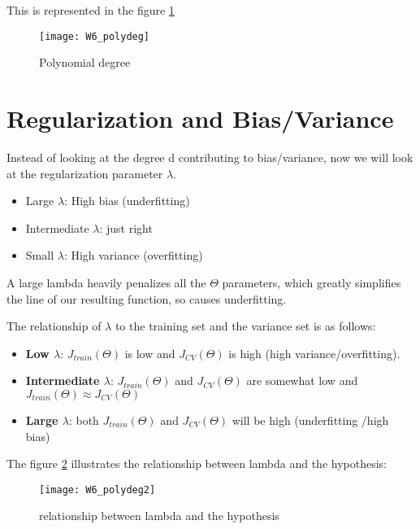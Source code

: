 This is represented in the figure \ref{fig:W6_polydeg}
\begin{figure}[ht]
\center
\texttt{[image: W6\_polydeg]}
\caption{Polynomial degree}
\label{fig:W6_polydeg}
\end{figure}
\section{Regularization and Bias/Variance}
Instead of looking at the degree d contributing to bias/variance, now we will look at the regularization parameter $\lambda$.

\begin{itemize}
\item Large $\lambda$: High bias (underfitting)
\item Intermediate $\lambda$: just right
\item Small $\lambda$: High variance (overfitting)
\end{itemize}

A large lambda heavily penalizes all the $\Theta$ parameters, which greatly simplifies the line of our resulting function, so causes underfitting.

The relationship of $\lambda$ to the training set and the variance set is as follows:

\begin{itemize}
\item \textbf{Low $\lambda$}: $J_{train}(\Theta)$ is low and $J_{CV}(\Theta)$ is high (high variance/overfitting).
\item \textbf{Intermediate $\lambda$}: $J_{train}(\Theta)$ and $J_{CV}(\Theta)$ are somewhat low and $J_{train}(\Theta) \approx J_{CV}(\Theta)$
\item \textbf{Large $\lambda$}: both $J_{train}(\Theta)$ and $J_{CV}(\Theta)$ will be high (underfitting /high bias)
\end{itemize}

The figure \ref{fig:W6_polydeg2} illustrates the relationship between lambda and the hypothesis:

\begin{figure}[ht]
\center
\texttt{[image: W6\_polydeg2]}
\caption{relationship between lambda and the hypothesis}
\label{fig:W6_polydeg2}
\end{figure}

